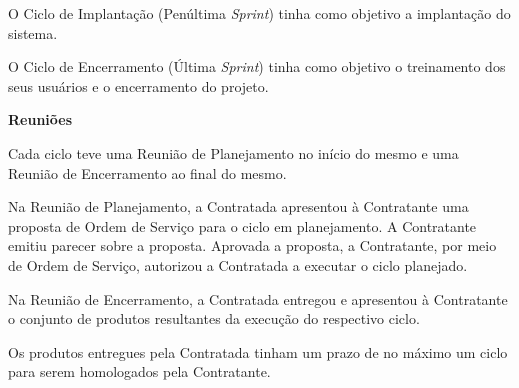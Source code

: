 O Ciclo de Implantação (Penúltima \textit{Sprint}) tinha como objetivo a implantação do sistema.

O Ciclo de Encerramento (Última \textit{Sprint}) tinha como objetivo o treinamento dos seus usuários e o encerramento do projeto.

\textbf{Reuniões}

Cada ciclo teve uma Reunião de Planejamento no início do mesmo e uma Reunião de Encerramento ao final do mesmo.

Na Reunião de Planejamento, a Contratada apresentou à Contratante uma proposta de Ordem de Serviço para o ciclo em planejamento. A Contratante emitiu parecer sobre a proposta. Aprovada a proposta, a Contratante, por meio de Ordem de Serviço, autorizou a Contratada a executar o ciclo planejado.

Na Reunião de Encerramento, a Contratada entregou e apresentou à Contratante o conjunto de produtos resultantes da execução do respectivo ciclo.

Os produtos entregues pela Contratada tinham um prazo de no máximo um ciclo para serem homologados pela Contratante.